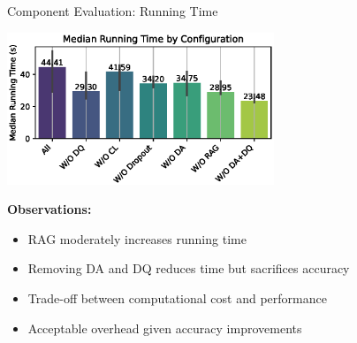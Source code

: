 \documentclass[aspectratio=1610]{beamer}
\begin{document}
    \begin{frame}{Component Evaluation: Running Time}
        \begin{center}
            \includegraphics[width=0.6\textwidth]{figs/ablation_study_time_10.eps}
        \end{center}

        \textbf{Observations:}
        \begin{itemize}
            \item RAG moderately increases running time
            \item Removing DA and DQ reduces time but sacrifices accuracy
            \item Trade-off between computational cost and performance
            \item Acceptable overhead given accuracy improvements
        \end{itemize}
    \end{frame}
\end{document}
